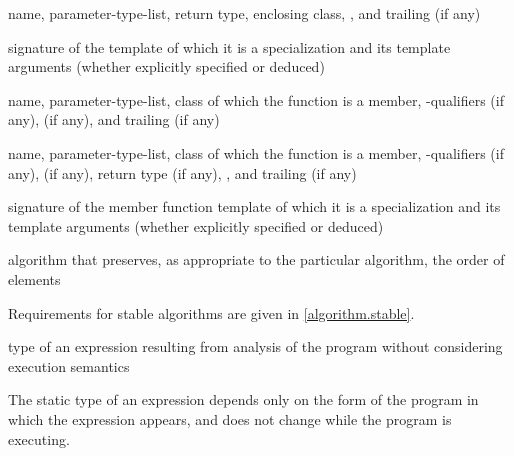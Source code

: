 %
name,
parameter-type-list,
return type,
enclosing class,
,
and
trailing  (if any)

%
 signature of the template of which it is a specialization
and its template arguments (whether explicitly specified or deduced)

%
name,
parameter-type-list,
class of which the function is a member,
\cv-qualifiers (if any),
 (if any),
and
trailing  (if any)

%
name,
parameter-type-list,
class of which the function is a member,
\cv-qualifiers (if any),
 (if any),
return type (if any),
,
and
trailing  (if any)

%
 signature of the member function template
of which it is a specialization and its template arguments (whether explicitly specified or deduced)

%
%
algorithm that preserves, as appropriate to the particular algorithm, the order
of elements

\begin{defnote}
Requirements for stable algorithms are given in \ref{algorithm.stable}.
\end{defnote}

%
type of an expression resulting from
analysis of the program without considering execution semantics

\begin{defnote}
The static type of an expression depends only on the form of the program in
which the expression appears, and does not change while the program is
executing.
\end{defnote}

